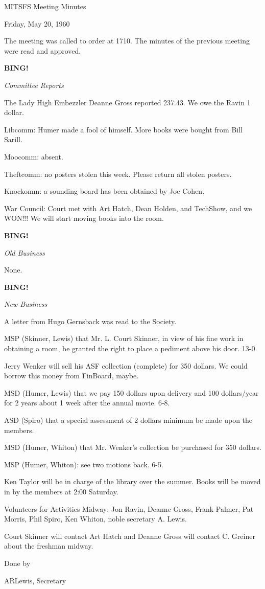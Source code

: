 \documentclass[12pt]{article}
\newcommand{\bing}{{\bf BING!} }
\newcommand{\goto}[1]{\bing \vskip 12pt \centerline{{\em{#1}}}}
\begin{document}
\begin{center}

MITSFS Meeting Minutes

Friday, May 20, 1960

\end{center}
 
\vspace{12pt}

\setlength{\parskip}{6pt}

\noindent
The meeting was called to order at 1710. The minutes of the previous meeting were read and approved.

\goto{Committee Reports}

The Lady High Embezzler Deanne Gross reported 237.43. We owe the Ravin 1 dollar.

Libcomm: Humer made a fool of himself. More books were bought from Bill Sarill.

Moocomm: absent.

Theftcomm: no posters stolen this week. Please return all stolen posters.

Knockomm: a sounding board has been obtained by Joe Cohen.

War Council: Court met with Art Hatch, Dean Holden, and TechShow, and we WON!!! We will start moving books into the room.

\goto{Old Business}

None.

\goto{New Business}

A letter from Hugo Gernsback was read to the Society.

MSP (Skinner, Lewis) that Mr. L. Court Skinner, in view of his fine work in obtaining a room, be granted the right to place a pediment above his door. 13-0.

Jerry Wenker will sell his ASF collection (complete) for 350 dollars. We could borrow this money from FinBoard, maybe.

MSD (Humer, Lewis) that we pay 150 dollars upon delivery and 100 dollars/year for 2 years about 1 week after the annual movie. 6-8.

ASD (Spiro) that a special assessment of 2 dollars minimum be made upon the members.

MSD (Humer, Whiton) that Mr. Wenker's collection be purchased for 350 dollars.

MSP (Humer, Whiton): see two motions back. 6-5.

Ken Taylor will be in charge of the library over the summer. Books will be moved in by the members at 2:00 Saturday.

Volunteers for Activities Midway: Jon Ravin, Deanne Gross, Frank Palmer, Pat Morris, Phil Spiro, Ken Whiton, noble secretary A. Lewis.

Court Skinner will contact Art Hatch and Deanne Gross will contact C. Greiner about the freshman midway.

\vspace{12pt}

\centerline{Done by}
\centerline{ARLewis, Secretary}
\end{document}
